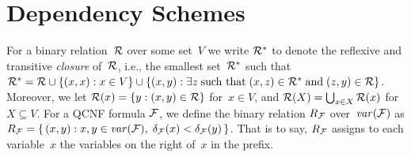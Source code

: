 \documentclass{llncs}
\newcommand{\SB}{\{\,} \newcommand{\SM}{\;{:}\;} \newcommand{\SE}{\,\}}
\begin{document}
\section{Dependency Schemes}
For a binary relation~$\mathcal{R}$ over some set~$V$ we write $\mathcal{R}^*$ to denote the
reflexive and transitive \emph{closure} of~$\mathcal{R}$, i.e., the smallest
set~$\mathcal{R}^*$ such that~$\mathcal{R}^* = \mathcal{R} \cup \{ (x,x) : x \in V \} \cup \{ (x,y)
: \exists z\;\mbox{such that}\; (x,z) \in \mathcal{R}^* \;\mbox{and}\; (z,y) \in \mathcal{R}
\}$. Moreover, we let $\mathcal{R}(x) = \{y : (x,y) \in \mathcal{R} \}$ for~$x \in V$, and
$\mathcal{R}(X) = \bigcup_{x \in X} \mathcal{R}(x)$ for $X \subseteq V$. For a QCNF formula
$\mathcal{F}$, we define the binary relation $R_{\mathcal{F}}$ over~$\mathit{var}(\mathcal{F})$ as $R_{\FFF}
= \SB (x,y) \SM x,y \in \var(\FFF), \;\delta_{\FFF}(x) < \delta_{\FFF}(y)
\SE$. That is to say, $R_{\mathcal{F}}$ assigns to each variable~$x$ the variables on
the right of~$x$ in the prefix.
\end{document}
